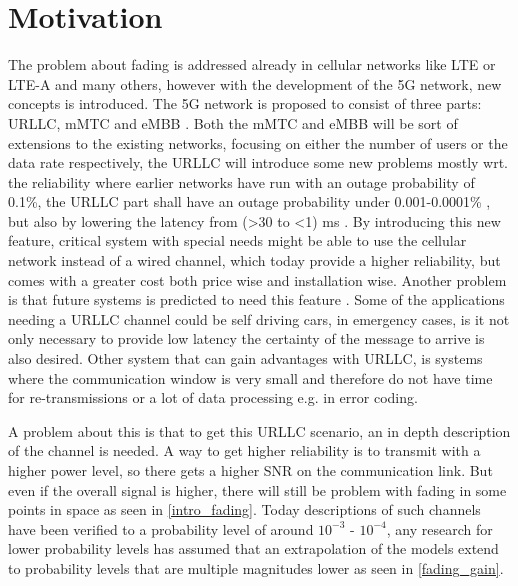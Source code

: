 \section{Motivation}
The problem about fading is addressed already in cellular networks like \gls{LTE} or \gls{LTE-A} and many others, however with the development of the 5G network, new concepts is introduced. The 5G network is proposed to consist of three parts: \Gls{URLLC}, \gls{mMTC} and \gls{eMBB} \citep{5G}. Both the \gls{mMTC} and \gls{eMBB} will be sort of extensions to the existing networks, focusing on either the number of users or the data rate respectively, the \gls{URLLC} will introduce some new problems mostly wrt. the reliability where earlier networks have run with an outage probability of 0.1\%, the URLLC part shall have an outage probability under 0.001-0.0001\% \citep{LTE,Petar5G}, but also by lowering the latency from (>30 to <1) ms \citep{LTE,5G_Latency}. By introducing this new feature, critical system with special needs might be able to use the cellular network instead of a wired channel, which today provide a higher reliability, but comes with a greater cost both price wise and installation wise. Another problem is that future systems is predicted to need this feature \citep{Petar5G}. %
Some of the applications needing a URLLC channel could be self driving cars, in emergency cases, is it not only necessary to provide low latency the certainty of the message to arrive is also desired. %
Other system that can gain advantages with URLLC, is systems where the communication window is very small and therefore do not have time for re-transmissions or a lot of data processing e.g. in error coding.


A problem about this is that to get this URLLC scenario, an in depth description of the channel is needed. A way to get higher reliability is to transmit with a higher power level, so there gets a higher \gls{SNR} on the communication link. But even if the overall signal is higher, there will still be problem with fading in some points in space as seen in \autoref{intro_fading}. Today descriptions of such channels have been verified to a probability level of around $10^{-3}$ - $10^{-4}$, any research for lower probability levels has assumed that an extrapolation of the models extend to probability levels that are multiple magnitudes lower as seen in \autoref{fading_gain}.


